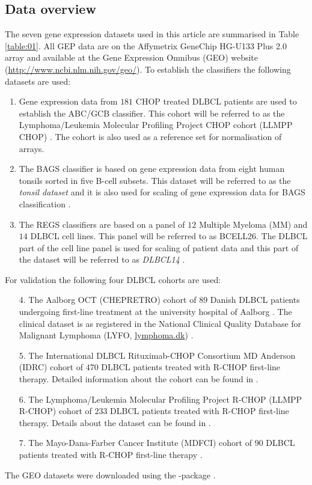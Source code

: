 \documentclass{article}
\begin{document}
\subsection{Data overview}
The seven gene expression datasets used in this article are summarised in Table \ref{table:01}.
All GEP data are on the Affymetrix GeneChip HG-U133 Plus 2.0 array and available at the Gene Expression Omnibus (GEO) \citep{Barrett2013} website (\url{http://www.ncbi.nlm.nih.gov/geo/}).
To establish the classifiers the following datasets are used:
\begin{enumerate}
  \item Gene expression data from $181$ CHOP treated DLBCL patients are used to establish the ABC/GCB classifier.
  This cohort will be referred to as the Lymphoma/Leukemia Molecular Profiling Project CHOP cohort (LLMPP CHOP) \citep{Lenz2008a}.
  The cohort is also used as a reference set for normalisation of arrays.
  \item The BAGS classifier is based on gene expression data from eight human tonsils sorted in five B-cell subsets.
  This dataset will be referred to as the \textit{tonsil dataset} and it is also used for scaling of gene expression data for BAGS classification \citep{DybkaerBoegsted2015}.
  \item The REGS classifiers are based on a panel of $12$ Multiple Myeloma (MM) and $14$ DLBCL cell lines.
  This panel will be referred to as BCELL26.
  The DLBCL part of the cell line panel is used for scaling of patient data and this part of the dataset will be referred to as \textit{DLBCL14} \citep{Falgreen2015}.
\end{enumerate}
For validation the following four DLBCL cohorts are used:
\begin{enumerate}
  \item[4.] The Aalborg OCT (CHEPRETRO) cohort of $89$ Danish DLBCL patients undergoing first-line treatment at the university  hospital of Aalborg \citep{DybkaerBoegsted2015}.
  The clinical dataset is as registered in the National Clinical Quality Database for Malignant Lymphoma (LYFO, \url{lymphoma.dk}) \citep{Gang2012}.
  \item[5.] The International DLBCL Rituximab-CHOP Consortium MD Anderson (IDRC) cohort of $470$ DLBCL patients treated with R-CHOP first-line therapy.
  Detailed information about the cohort can be found in \citep{Visco2012}.
  \item[6.] The Lymphoma/Leukemia Molecular Profiling Project R-CHOP (LLMPP R-CHOP) cohort of $233$ DLBCL patients treated with R-CHOP first-line therapy.
  Details about the dataset can be found in \citep{Lenz2008a}.
  \item[7.] The Mayo-Dana-Farber Cancer Institute (MDFCI) cohort of $90$ DLBCL patients treated with R-CHOP first-line therapy \citep{Monti2012a}.
\end{enumerate}
The GEO datasets were downloaded using the \R{}-package  \citep{DLBCLdata}.
\end{document}
